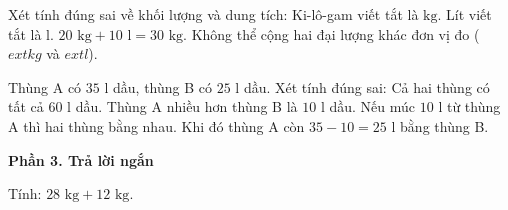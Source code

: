 \begin{ex} %
Xét tính đúng sai về khối lượng và dung tích:
\choiceTF
{\True Ki-lô-gam viết tắt là $\text{kg}$.}
{\True Lít viết tắt là $\text{l}$.}
{$20\text{ kg} + 10\text{ l} = 30\text{ kg}$.}
{\True Không thể cộng hai đại lượng khác đơn vị đo ($	ext{kg}$ và $	ext{l}$).}
\end{ex}

\begin{ex} %
Thùng A có $35\text{ l}$ dầu, thùng B có $25\text{ l}$ dầu. Xét tính đúng sai:
\choiceTF
{\True Cả hai thùng có tất cả $60\text{ l}$ dầu.}
{\True Thùng A nhiều hơn thùng B là $10\text{ l}$ dầu.}
{Nếu múc $10\text{ l}$ từ thùng A thì hai thùng bằng nhau.}
{\True Khi đó thùng A còn $35 - 10 = 25\text{ l}$ bằng thùng B.}
\end{ex}

\textbf{Phần 3. Trả lời ngắn}

\begin{ex} %
Tính: $28\text{ kg} + 12\text{ kg}$.
\end{ex}

